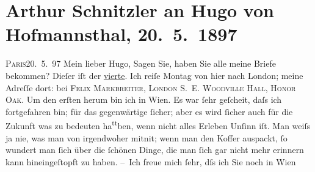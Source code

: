 

         
         \renewcommand{\erwaehntePersonen}{Personen: Richard Beer-Hofmann, Paul Goldmann, Hugo von Hofmannsthal, Hugo August von Hofmannsthal, Anna von Hofmannsthal, Felix Markbreiter}
         \renewcommand{\erwaehnteOrte}{Orte: Bad Ischl, Bayreuth, Honor Oak, London, Paris, Wien}
         \renewcommand{\erwaehnteWerke}{}
               \section[Arthur Schnitzler an Hugo von Hofmannsthal, 20. 5. 1897]{ Arthur Schnitzler an Hugo von Hofmannsthal, 20. 5. 1897}\nopagebreak{}\rehead{ }\begin{ledgroupsized}[t]{13cm}\normalsize\beginnumbering \toendnotes[C]{\smallbreak\pagebreak[2]} 
\toendnotes[C]{\smallbreak}\pstart
           \raggedleft{}{\pb}\textsc{Paris}20. 5. 97\pend
           \pstart
           Mein lieber Hugo, Sagen Sie, haben Sie alle meine Briefe bekommen?
               Dieſer iſt der \uline{vierte}.\pend
           \pstart
           Ich reiſe Montag von hier nach London; meine
               Adreſſe dort: bei \textsc{Felix Markbreiter, London S. E. Woodville Hall, Honor Oak.}\pend
           \pstart
           Um den erſten herum bin ich in Wien.
               Es war ſehr geſcheit, daſs ich fortgefahren bin; für {\pb}das
               gegenwärtige ſicher; aber es wird ſicher auch für die Zukunft was zu bedeuten ha\substVorne{}\textsuperscript{tt}\substDazwischen{}b\substHinten{}en, wenn nicht alles Erleben Unſinn iſt. Man weiſs ja nie, was man von
               irgendwoher mitni{\geminationm}t; wenn man den Koffer auspackt, ſo
               wundert man ſich über die ſchönen Dinge, die man ſich gar nicht mehr erinnern {\pb}kann hineingeſtopft zu haben.\pend
           \pstart
           – Ich freue mich ſehr, dſs ich Sie noch in Wien

\end{ledgroupsized}
